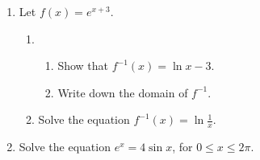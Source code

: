 \documentclass[12pt, oneside]{article}
\begin{document}
\begin{enumerate}
\item Let $f(x)= e^{x+3}$.
\begin{enumerate}
    \item
    \begin{enumerate}
    \item Show that $f^{-1}(x) = \ln x - 3$.
        \begin{flushright}[3]\end{flushright}
    \item Write down the domain of $f^{-1}$.
    \end{enumerate}
    \item Solve the equation $f^{-1}(x) = \ln \frac{1}{x}$.
        \begin{flushright}[4]\end{flushright}
\end{enumerate}

\item Solve the equation $e^x = 4 \sin x$, for $0 \leq x \leq 2 \pi$.
    \begin{flushright}[5]\end{flushright}


\end{enumerate}
\end{document}
